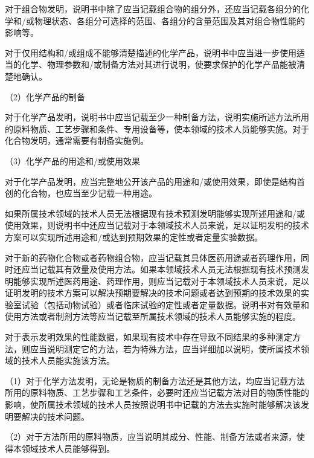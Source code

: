 对于组合物发明，说明书中除了应当记载组合物的组分外，还应当记载各组分的化学和/或物理状态、各组分可选择的范围、各组分的含量范围及其对组合物性能的影响等。

对于仅用结构和/或组成不能够清楚描述的化学产品，说明书中应当进一步使用适当的化学、物理参数和/或制备方法对其进行说明，使要求保护的化学产品能被清楚地确认。

{\setlength{\parindent}{17.1bp}（2）化学产品的制备\par}

对于化学产品发明，说明书中应当记载至少一种制备方法，说明实施所述方法所用的原料物质、工艺步骤和条件、专用设备等，使本领域的技术人员能够实施。对于化合物发明，通常需要有制备实施例。

{\setlength{\parindent}{17.1bp}（3）化学产品的用途和/或使用效果\par}

对于化学产品发明，应当完整地公开该产品的用途和/或使用效果，即使是结构首创的化合物，也应当至少记载一种用途。

如果所属技术领域的技术人员无法根据现有技术预测发明能够实现所述用途和/或使用效果，则说明书中还应当记载对于本领域技术人员来说，足以证明发明的技术方案可以实现所述用途和/或达到预期效果的定性或者定量实验数据。

对于新的药物化合物或者药物组合物，应当记载其具体医药用途或者药理作用，同时还应当记载其有效量及使用方法。如果本领域技术人员无法根据现有技术预测发明能够实现所述医药用途、药理作用，则应当记载对于本领域技术人员来说，足以证明发明的技术方案可以解决预期要解决的技术问题或者达到预期的技术效果的实验室试验（包括动物试验）或者临床试验的定性或者定量数据。说明书对有效量和使用方法或者制剂方法等应当记载至所属技术领域的技术人员能够实施的程度。

对于表示发明效果的性能数据，如果现有技术中存在导致不同结果的多种测定方法，则应当说明测定它的方法，若为特殊方法，应当详细加以说明，使所属技术领域的技术人员能实施该方法。

{\setlength{\parindent}{17.1bp}（1）对于化学方法发明，无论是物质的制备方法还是其他方法，均应当记载方法所用的原料物质、工艺步骤和工艺条件，必要时还应当记载方法对目的物质性能的影响，使所属技术领域的技术人员按照说明书中记载的方法去实施时能够解决该发明要解决的技术问题。\par}

{\setlength{\parindent}{17.1bp}（2）对于方法所用的原料物质，应当说明其成分、性能、制备方法或者来源，使得本领域技术人员能够得到。\par}

